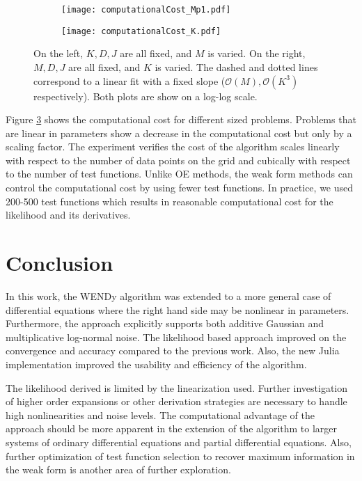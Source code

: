 \begin{figure}[ht]
    \centering
\begin{subfigure}{0.49\textwidth}
    \texttt{[image: computationalCost\_Mp1.pdf]}
    \caption{}
    \label{fig:compCost:subM}
\end{subfigure} 
\begin{subfigure}{0.49\textwidth}
    \texttt{[image: computationalCost\_K.pdf]}
    \caption{}
    \label{fig:compCost:subK}
\end{subfigure}
\caption{On the left, $K, D, J$ are all fixed, and $M$ is varied. On the right, $M, D, J$ are all fixed, and $K$ is varied.  The dashed and dotted lines correspond to a linear fit with a fixed slope ($\mathcal{O}(M), \mathcal{O}(K^3)$ respectively). Both plots are show on a log-log scale.}
\label{fig:compCost}
\end{figure}
Figure \ref{fig:compCost} shows the computational cost for different sized problems. Problems that are linear in parameters show a decrease in the computational cost but only by a scaling factor. The experiment verifies the cost of the algorithm scales linearly with respect to the number of data points on the grid and cubically with respect to the number of test functions. Unlike OE methods, the weak form methods can control the computational cost by using fewer test functions. In practice, we used 200-500 test functions which results in reasonable computational cost for the likelihood and its derivatives.

\section{Conclusion} \label{sec:conclusion}

In this work, the WENDy algorithm was extended to a more general case of differential equations where the right hand side may be nonlinear in parameters. Furthermore, the approach explicitly supports both additive Gaussian and multiplicative log-normal noise. The likelihood based approach improved on the convergence and accuracy compared to the previous work. Also, the new Julia implementation improved the usability and efficiency of the algorithm. 

The likelihood derived is limited by the linearization used. Further investigation of higher order expansions or other derivation strategies are necessary to handle high nonlinearities and noise levels. The computational advantage of the approach should be more apparent in the extension of the algorithm to larger systems of ordinary differential equations and partial differential equations. Also, further optimization of test function selection to recover maximum information in the weak form is another area of further exploration. 


